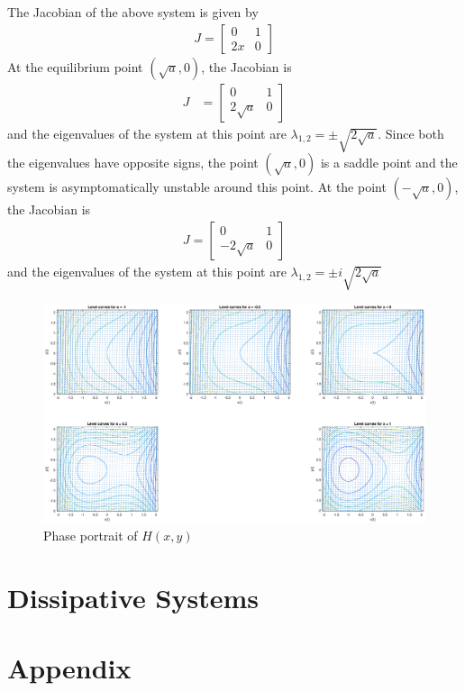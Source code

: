 \documentclass[12pt,1in]{article}
\newenvironment{Example}[2][Example]{\begin{trivlist}
		\item[\hskip \labelsep {\bfseries #1}\hskip \labelsep {\bfseries #2.}]}{\end{trivlist}}
\begin{document}
\begin{Example}{1}
	The Jacobian of the above system is given by 
	\begin{align*}
	J = \begin{bmatrix}
	0 & 1 \\
	2x & 0
	\end{bmatrix}
	\end{align*} 
	At the equilibrium point $(\sqrt{a}, 0)$, the Jacobian is 
	\begin{align*}
	J &= \begin{bmatrix}
	0 & 1 \\
	2\sqrt{a} & 0
	\end{bmatrix}
	\end{align*}
	and the eigenvalues of the system at this point are $\lambda_{1,2} = \pm \sqrt{2 \sqrt{a}}$. Since both the eigenvalues have opposite signs, the point $(\sqrt{a}, 0)$ is a saddle point and the system is asymptomatically unstable around this point. At the point $(-\sqrt{a}, 0)$, the Jacobian is 
	\begin{align*}
	J = \begin{bmatrix}
	0 & 1 \\
	-2\sqrt{a} & 0
	\end{bmatrix}
	\end{align*} 
	and the eigenvalues of the system at this point are $\lambda_{1,2} = \pm i \sqrt{2 \sqrt{a}}$
	
\begin{figure}
	\centering
	\includegraphics[trim={2in 0 1.5in 0}, width=\linewidth]{Figures/hamiltonian}
	\caption{Phase portrait of $H(x,y)$}
	\label{fig:hamiltonian}
\end{figure}
\end{Example}
\section{Dissipative Systems}
\section{Appendix}



\end{document}
